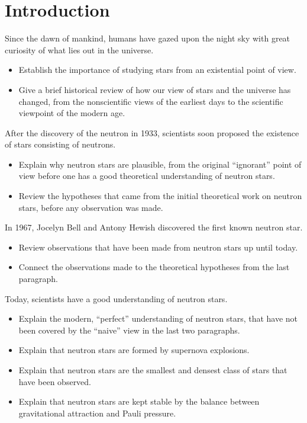 \chapter*{Introduction}

Since the dawn of mankind, humans have gazed upon the night sky with great curiosity of what lies out in the universe.
\begin{itemize}
\item Establish the importance of studying stars from an existential point of view.
\item Give a brief historical review of how our view of stars and the universe has changed, from the nonscientific views of the earliest days to the scientific viewpoint of the modern age.
\end{itemize}

After the discovery of the neutron in 1933, scientists soon proposed the existence of stars consisting of neutrons.
\begin{itemize}
\item Explain why neutron stars are plausible, from the original ``ignorant'' point of view before one has a good theoretical understanding of neutron stars.
\item Review the hypotheses that came from the initial theoretical work on neutron stars, before any observation was made.
\end{itemize}

In 1967, Jocelyn Bell and Antony Hewish discovered the first known neutron star.
\begin{itemize}
\item Review observations that have been made from neutron stars up until today.
\item Connect the observations made to the theoretical hypotheses from the last paragraph.
\end{itemize}

Today, scientists have a good understanding of neutron stars.
\begin{itemize}
\item Explain the modern, ``perfect'' understanding of neutron stars, that have not been covered by the ``naive'' view in the last two paragraphs.
\item Explain that neutron stars are formed by supernova explosions.
\item Explain that neutron stars are the smallest and densest class of stars that have been observed.
\item Explain that neutron stars are kept stable by the balance between gravitational attraction and Pauli pressure.
\end{itemize}


